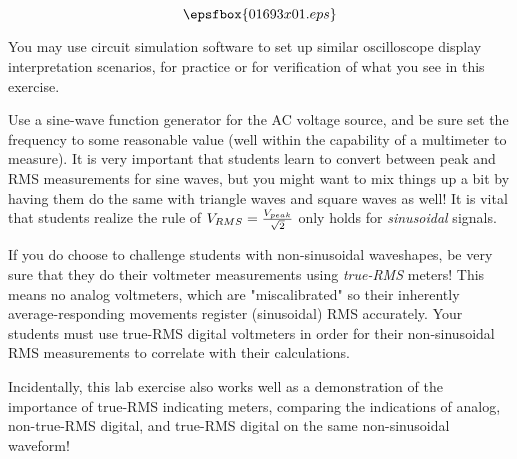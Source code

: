 

$$\epsfbox{01693x01.eps}$$

\vfil \eject






You may use circuit simulation software to set up similar oscilloscope display interpretation scenarios, for practice or for verification of what you see in this exercise.







Use a sine-wave function generator for the AC voltage source, and be sure set the frequency to some reasonable value (well within the capability of a multimeter to measure).  It is very important that students learn to convert between peak and RMS measurements for sine waves, but you might want to mix things up a bit by having them do the same with triangle waves and square waves as well!  It is vital that students realize the rule of $V_{RMS} = {V_{peak} \over \sqrt{2}}$ only holds for {\it sinusoidal} signals.

If you do choose to challenge students with non-sinusoidal waveshapes, be very sure that they do their voltmeter measurements using {\it true-RMS} meters!  This means no analog voltmeters, which are "miscalibrated" so their inherently average-responding movements register (sinusoidal) RMS accurately.  Your students must use true-RMS digital voltmeters in order for their non-sinusoidal RMS measurements to correlate with their calculations.

Incidentally, this lab exercise also works well as a demonstration of the importance of true-RMS indicating meters, comparing the indications of analog, non-true-RMS digital, and true-RMS digital on the same non-sinusoidal waveform!




